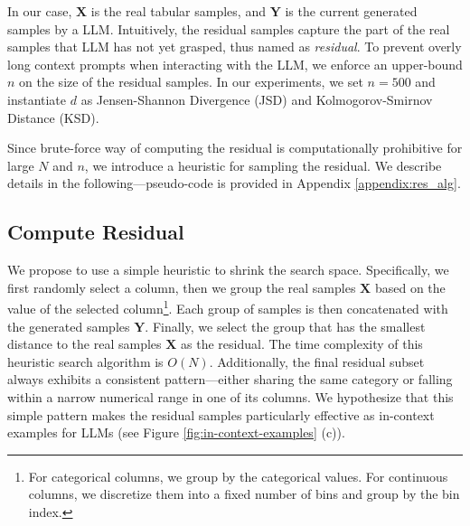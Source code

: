 \begin{remark}
  In our case, $\boldsymbol{X}$ is the real tabular samples, and $\boldsymbol{Y}$ is the current generated samples by a LLM. Intuitively, the residual samples capture the part of the real samples that LLM has not yet grasped, thus named as \textit{residual}. To prevent overly long context prompts when interacting with the LLM, we enforce an upper-bound 
  $n$ on the size of the residual samples. 
  In our experiments, we set $n=500$ and instantiate $d$ as Jensen-Shannon Divergence (JSD) and Kolmogorov-Smirnov Distance (KSD).
\end{remark}

Since brute-force way of computing the residual is computationally prohibitive for large $N$ and $n$, we introduce a heuristic for sampling the residual. We describe details in the following—pseudo-code is provided in Appendix \ref{appendix:res_alg}.

\subsection{Compute Residual}
We propose to use a simple heuristic to shrink the search space. Specifically, we first randomly select a column, then we group the real samples $\boldsymbol{X}$ based on the value of the selected column\footnote{For categorical columns, we group by the categorical values. For continuous columns, we discretize them into a fixed number of bins and group by the bin index.}. Each group of samples is then concatenated with the generated samples $\boldsymbol{Y}$. Finally, we select the group that has the smallest distance to the real samples $\boldsymbol{X}$ as the residual. The time complexity of this heuristic search algorithm is $O(N)$. Additionally, the final residual subset always exhibits a consistent pattern—either sharing the same category or falling within a narrow numerical range in one of its columns. We hypothesize that this simple pattern makes the residual samples particularly effective as in-context examples for LLMs (see Figure \ref{fig:in-context-examples} (c)). 





